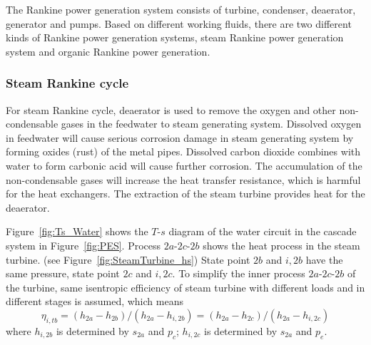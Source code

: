 The Rankine power generation system consists of turbine, condenser, deaerator, generator and pumps. Based on different working fluids, there are two different kinds of Rankine power generation systems, steam Rankine power generation system and organic Rankine power generation.
\subsubsection{Steam Rankine cycle}
  
  For steam Rankine cycle, deaerator is used to remove the oxygen and other non-condensable gases in the feedwater to steam generating system. Dissolved oxygen in feedwater will cause serious corrosion damage in steam generating system by forming oxides (rust) of the metal pipes. Dissolved carbon dioxide combines with water to form carbonic acid will cause further corrosion. The accumulation of the non-condensable gases will increase the heat transfer resistance, which is harmful for the heat exchangers. The extraction of the steam turbine provides heat for the deaerator.
  
  Figure~\ref{fig:Ts_Water} shows the $T$-$s$ diagram of the water circuit in the cascade system in Figure~\ref{fig:PES}. Process $2a$-$2c$-$2b$ shows the heat process in the steam turbine. (see Figure~\ref{fig:SteamTurbine_hs}) State point $2b$ and $i,2b$ have the same pressure, state point $2c$ and $i,2c$. To simplify the inner process $2a$-$2c$-$2b$ of the turbine, same isentropic efficiency of steam turbine with different loads and in different stages is assumed, which means  
  \begin{equation}
      \eta_{i,tb} =(h_{2a}-h_{2b})/(h_{2a}-h_{i,2b}) = (h_{2a}-h_{2c})/(h_{2a}-h_{i,2c})
\end{equation}
where $h_{i,2b}$ is determined by $s_{2a}$ and $p_c$; $h_{i,2c}$ is determined by $s_{2a}$ and $p_e$.

